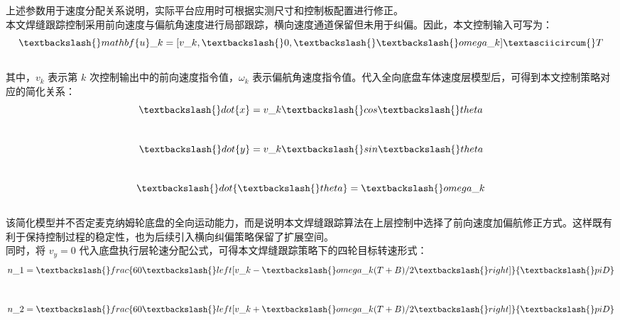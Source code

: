 \documentclass[UTF8,a4paper,12pt]{ctexrep}
\begin{document}
上述参数用于速度分配关系说明，实际平台应用时可根据实测尺寸和控制板配置进行修正。\\

本文焊缝跟踪控制采用前向速度与偏航角速度进行局部跟踪，横向速度通道保留但未用于纠偏。因此，本文控制输入可写为：\\

$$\\
\textbackslash\{\}mathbf\{u\}\_k=[v\_k,\textbackslash\{\} 0,\textbackslash\{\} \textbackslash\{\}omega\_k]\textasciicircum{}T\\
$$\\

其中，$v_k$ 表示第 $k$ 次控制输出中的前向速度指令值，$\omega_k$ 表示偏航角速度指令值。代入全向底盘车体速度层模型后，可得到本文控制策略对应的简化关系：\\

$$\\
\textbackslash\{\}dot\{x\}=v\_k\textbackslash\{\}cos\textbackslash\{\}theta\\
$$\\

$$\\
\textbackslash\{\}dot\{y\}=v\_k\textbackslash\{\}sin\textbackslash\{\}theta\\
$$\\

$$\\
\textbackslash\{\}dot\{\textbackslash\{\}theta\}=\textbackslash\{\}omega\_k\\
$$\\

该简化模型并不否定麦克纳姆轮底盘的全向运动能力，而是说明本文焊缝跟踪算法在上层控制中选择了前向速度加偏航修正方式。这样既有利于保持控制过程的稳定性，也为后续引入横向纠偏策略保留了扩展空间。\\

同时，将 $v_y=0$ 代入底盘执行层轮速分配公式，可得本文焊缝跟踪策略下的四轮目标转速形式：\\

$$\\
n\_1=\textbackslash\{\}frac\{60\textbackslash\{\}left[v\_k-\textbackslash\{\}omega\_k(T+B)/2\textbackslash\{\}right]\}\{\textbackslash\{\}pi D\}\\
$$\\

$$\\
n\_2=\textbackslash\{\}frac\{60\textbackslash\{\}left[v\_k+\textbackslash\{\}omega\_k(T+B)/2\textbackslash\{\}right]\}\{\textbackslash\{\}pi D\}\\
$$\\
\end{document}
